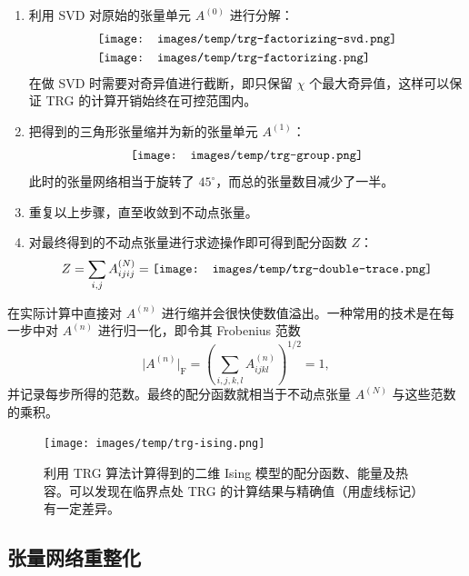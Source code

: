 \begin{enumerate}
  \item 利用 SVD 对原始的张量单元 $A^{(0)}$ 进行分解：
    \begin{align}
      & \vcenter{\hbox{\texttt{[image: images/temp/trg-factorizing-svd.png]}}}
        \label{eq:trg-factorizing-svd} \\
      & \vcenter{\hbox{\texttt{[image: images/temp/trg-factorizing.png]}}}
    \end{align}
    在做 SVD 时需要对奇异值进行截断，即只保留 $\chi$ 个最大奇异值，这样可以保证 TRG 的计算开销始终在可控范围内。

  \item 把得到的三角形张量缩并为新的张量单元 $A^{(1)}$：
    \begin{equation}
      \vcenter{\hbox{\texttt{[image: images/temp/trg-group.png]}}}
    \end{equation}
    此时的张量网络相当于旋转了 $45^\circ$，而总的张量数目减少了一半。

  \item 重复以上步骤，直至收敛到不动点张量。

  \item 对最终得到的不动点张量进行求迹操作即可得到配分函数 $Z$：
    \begin{equation}
      Z = \sum_{i,j} A^{(N)}_{ijij}
        = \vcenter{\hbox{\texttt{[image: images/temp/trg-double-trace.png]}}}
      \label{eq:trg-partition-function}
    \end{equation}
\end{enumerate}

在实际计算中直接对 $A^{(n)}$ 进行缩并会很快使数值溢出。一种常用的技术是在每一步中对 $A^{(n)}$ 进行归一化，即令其 Frobenius 范数
\begin{equation}
  \bigl| A^{(n)} \bigr|_{\mathrm{F}} = \left( \sum_{i,j,k,l} A^{(n)}_{ijkl} \right)^{1/2} = 1,
\end{equation}
并记录每步所得的范数。最终的配分函数就相当于不动点张量 $A^{(N)}$ 与这些范数的乘积。

\begin{figure}[htb]
  \centering
  \texttt{[image: images/temp/trg-ising.png]}
  \caption[利用 TRG 算法计算得到的二维 Ising 模型的各物理量]{利用 TRG 算法计算得到的二维 Ising 模型的配分函数、能量及热容。可以发现在临界点处 TRG 的计算结果与精确值（用虚线标记）有一定差异。}
  \label{fig:trg-ising}
\end{figure}

\subsection{张量网络重整化}


